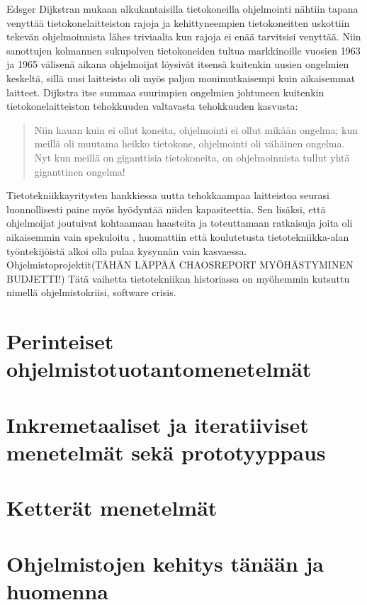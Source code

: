 \documentclass[finnish,12pt]{tktltiki2}
\theoremstyle{definition}
\theoremstyle{remark}
\begin{document}
Edsger Dijkstran mukaan alkukantaisilla tietokoneilla ohjelmointi nähtiin tapana venyttää tietokonelaitteiston rajoja ja kehittyneempien tietokoneitten uskottiin tekevän ohjelmoinnista lähes triviaalia kun rajoja ei enää tarvitsisi venyttää. \cite{Dijkstra:1979:HP:1241515.1241525} Niin sanottujen kolmannen sukupolven tietokoneiden tultua markkinoille vuosien 1963 ja 1965 välisenä aikana ohjelmoijat löysivät itsensä kuitenkin uusien ongelmien keskeltä, sillä uusi laitteisto oli myös paljon monimutkaisempi kuin aikaisemmat laitteet. Dijkstra itse summaa suurimpien ongelmien johtuneen kuitenkin tietokonelaitteiston tehokkuuden valtavasta tehokkuuden kasvusta: \begin{quote}
Niin kauan kuin ei ollut koneita, ohjelmointi ei ollut mikään ongelma; kun meillä oli muutama heikko tietokone, ohjelmointi oli vähäinen ongelma. Nyt kun meillä on giganttisia tietokoneita, on ohjelmoinnista tullut yhtä giganttinen ongelma! \cite{Dijkstra:1979:HP:1241515.1241525}
\end{quote} Tietotekniikkayritysten hankkiessa uutta tehokkaampaa laitteistoa seurasi luonnollisesti paine myös hyödyntää niiden kapasiteettia. Sen lisäksi, että ohjelmoijat joutuivat kohtaamaan haasteita ja toteuttamaan ratkaisuja joita oli aikaisemmin vain spekuloitu \cite{Dijkstra:1979:HP:1241515.1241525}, huomattiin että koulutetusta tietotekniikka-alan työntekijöistä alkoi olla pulaa kysynnän vain kasvaessa. \cite{DBLP:reference/se/Grier10} Ohjelmistoprojektit(TÄHÄN LÄPPÄÄ CHAOSREPORT MYÖHÄSTYMINEN BUDJETTI!) Tätä vaihetta tietotekniikan historiassa on myöhemmin kutsuttu nimellä ohjelmistokriisi, software crisis.



\section{Perinteiset ohjelmistotuotantomenetelmät}
\section{Inkremetaaliset ja iteratiiviset menetelmät sekä prototyyppaus}
\section{Ketterät menetelmät}
\section{Ohjelmistojen kehitys tänään ja huomenna}
\end{document}
